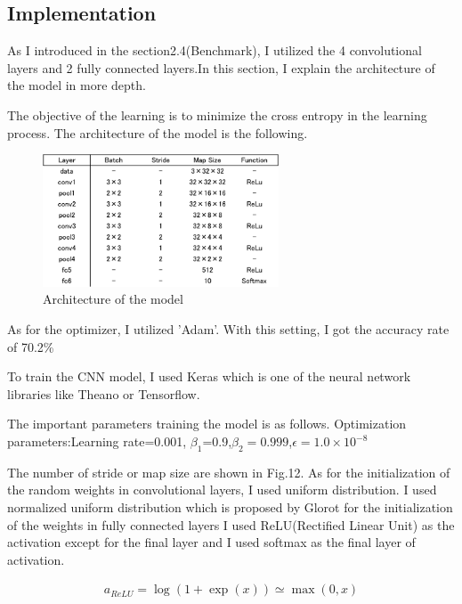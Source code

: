 \subsection{Implementation}


As I introduced in the section2.4(Benchmark), I utilized the 4 convolutional layers and 2 fully connected layers.In this section, I explain the architecture of the model in more depth.

The objective of the learning is to minimize the cross entropy in the learning process.
The architecture of the model is the following.

 \begin{figure}[H]

	\begin{center}
	\includegraphics[width=7cm]{picture/layer_architecture.png}
	\caption{Architecture of the model}
	\end{center}
	\label{fig:9}

\end{figure}


As for the optimizer, I utilized 'Adam'.
With this setting, I got the accuracy rate of 70.2\%

To train the CNN model, I used Keras which is one of the neural network libraries like Theano or Tensorflow.

The important parameters training the model is as follows.
Optimization parameters:Learning rate=0.001, $\beta_{1}$=0.9,$\beta_{2}=0.999$,$\epsilon=1.0\times10^{-8}$

The number of stride or map size are shown in Fig.12.
As for the initialization of the random weights in convolutional layers, I used uniform distribution.
I used normalized uniform distribution which is proposed by Glorot\cite{Glorot} for the initialization of the weights in fully connected layers
I used ReLU(Rectified Linear Unit) as the activation except for the final layer and I used softmax as the final layer of activation.


\begin{eqnarray}
 a_{ReLU}=\log(1+\exp(x)) \simeq \max(0,x)
\end{eqnarray}


